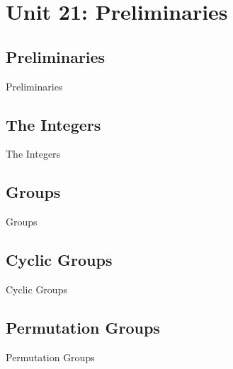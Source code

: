 \chapter{Unit 21: Preliminaries}
\label{chap:unit21}

\section{Preliminaries}
\label{sec:preliminaries}

Preliminaries

\section{The Integers}
\label{sec:the-integers}

The Integers

\section{Groups}
\label{sec:groups}

Groups

\section{Cyclic Groups}
\label{sec:cyclic-groups}

Cyclic Groups

\section{Permutation Groups}
\label{sec:permutation-groups}

Permutation Groups

